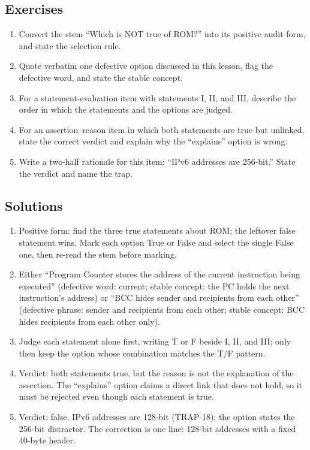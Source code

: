 \documentclass[11pt]{article}
\begin{document}
\subsection*{Exercises}
\begin{enumerate}[label=\arabic*.]
  \item Convert the stem ``Which is NOT true of ROM?'' into its positive
    audit form, and state the selection rule.
  \item Quote verbatim one defective option discussed in this lesson, flag
    the defective word, and state the stable concept.
  \item For a statement-evaluation item with statements I, II, and III,
    describe the order in which the statements and the options are judged.
  \item For an assertion--reason item in which both statements are true but
    unlinked, state the correct verdict and explain why the ``explains''
    option is wrong.
  \item Write a two-half rationale for this item: ``IPv6 addresses are
    256-bit.'' State the verdict and name the trap.
\end{enumerate}

\subsection*{Solutions}
\begingroup\small
\begin{enumerate}[label=\arabic*.]
  \item Positive form: find the three true statements about ROM; the
    leftover false statement wins. Mark each option True or False and select
    the single False one, then re-read the stem before marking.
  \item Either ``Program Counter stores the address of the current
    instruction being executed'' (defective word: current; stable concept:
    the PC holds the next instruction's address) or ``BCC hides sender and
    recipients from each other'' (defective phrase: sender and recipients
    from each other; stable concept: BCC hides recipients from each other
    only).
  \item Judge each statement alone first, writing T or F beside I, II, and
    III; only then keep the option whose combination matches the T/F
    pattern.
  \item Verdict: both statements true, but the reason is not the explanation
    of the assertion. The ``explains'' option claims a direct link that does
    not hold, so it must be rejected even though each statement is true.
  \item Verdict: false. IPv6 addresses are 128-bit (TRAP-18); the option
    states the 256-bit distractor. The correction is one line: 128-bit
    addresses with a fixed 40-byte header.
\end{enumerate}
\endgroup
\end{document}

